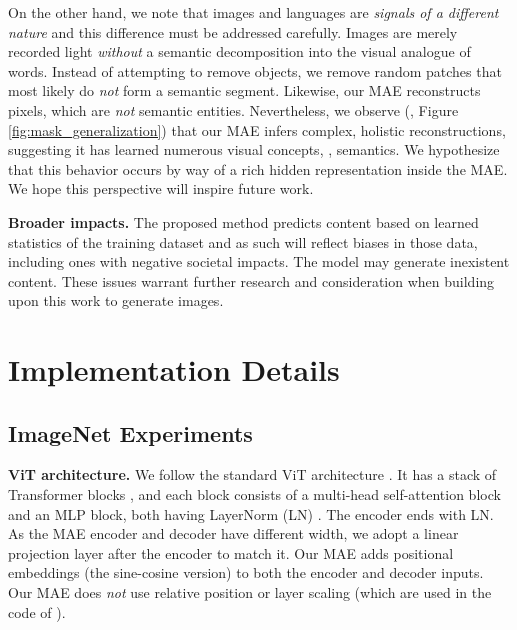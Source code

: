 \documentclass[10pt,twocolumn,letterpaper]{article}
\renewcommand{\paragraph}[1]{\vspace{1.25mm}\noindent\textbf{#1}}
\begin{document}
On the other hand, we note that images and languages are \textit{signals of a different nature} and this difference must be addressed carefully. Images are merely recorded light \mbox{\textit{without}} a semantic decomposition into the visual analogue of words. Instead of attempting to remove objects, we remove random patches that most likely do \textit{not} form a semantic segment. Likewise, our MAE reconstructs pixels, which are \emph{not} semantic entities. Nevertheless, we observe (\eg, Figure \ref{fig:mask_generalization}) that our MAE infers complex, holistic reconstructions, suggesting it has learned numerous visual concepts, \ie, semantics. We hypothesize that this behavior occurs by way of a rich hidden representation inside the MAE. We hope this perspective will inspire future work.

\paragraph{Broader impacts.} The proposed method predicts content based on learned statistics of the training dataset and as such will reflect biases in those data, including ones with negative societal impacts. The model may generate inexistent content. These issues warrant further research and consideration when building upon this work to generate images.

{
\fontsize{8.2pt}{9.84pt}\selectfont
}

\clearpage
\newpage
\appendix

\section{Implementation Details}\label{app:impl}

\subsection{ImageNet Experiments}\label{app:impl_mae}

\paragraph{ViT architecture.} We follow the standard ViT architecture \cite{Dosovitskiy2021}. It has a stack of Transformer blocks \cite{Vaswani2017}, and each block consists of a multi-head self-attention block and an MLP block, both having LayerNorm (LN) \cite{Ba2016}. The encoder ends with LN. As the MAE encoder and decoder have different width, we adopt a linear projection layer after the encoder to match it. Our MAE adds positional embeddings \cite{Vaswani2017} (the sine-cosine version) to both the encoder and decoder inputs. Our MAE does \textit{not} use relative position or layer scaling (which are used in the code of \cite{Bao2021}).
\end{document}
